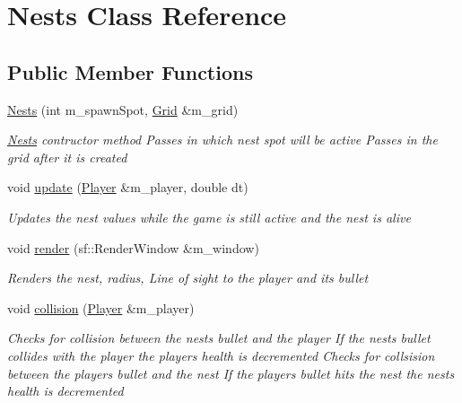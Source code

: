 \hypertarget{class_nests}{}\section{Nests Class Reference}
\label{class_nests}
\subsection*{Public Member Functions}
\begin{DoxyCompactItemize}
\item 
\mbox{\hyperlink{class_nests_ae9e040d5e6f53f7390fa25a909db6cf4}{Nests}} (int m\+\_\+spawn\+Spot, \mbox{\hyperlink{class_grid}{Grid}} \&m\+\_\+grid)
\begin{DoxyCompactList}\small\item\em \mbox{\hyperlink{class_nests}{Nests}} contructor method Passes in which nest spot will be active Passes in the grid after it is created \end{DoxyCompactList}\item 
void \mbox{\hyperlink{class_nests_a90eb0853ddad202743d19375b9d8d76b}{update}} (\mbox{\hyperlink{class_player}{Player}} \&m\+\_\+player, double dt)
\begin{DoxyCompactList}\small\item\em Updates the nest values while the game is still active and the nest is alive \end{DoxyCompactList}\item 
void \mbox{\hyperlink{class_nests_afc6913bd1628de06319db793053adb79}{render}} (sf\+::\+Render\+Window \&m\+\_\+window)
\begin{DoxyCompactList}\small\item\em Renders the nest, radius, Line of sight to the player and its bullet \end{DoxyCompactList}\item 
void \mbox{\hyperlink{class_nests_a524f84ef21f6cf7943f2a82eecc1d18e}{collision}} (\mbox{\hyperlink{class_player}{Player}} \&m\+\_\+player)
\begin{DoxyCompactList}\small\item\em Checks for collision between the nests bullet and the player If the nests bullet collides with the player the players health is decremented Checks for collsision between the players bullet and the nest If the player\textquotesingle{}s bullet hits the nest the nests\textquotesingle{} health is decremented \end{DoxyCompactList}\item 

\end{DoxyCompactItemize}
